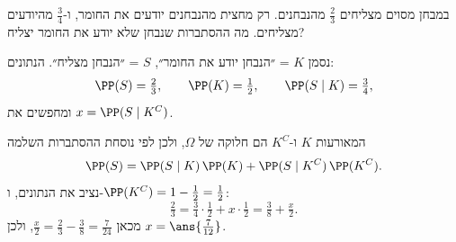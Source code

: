 במבחן מסוים מצליחים $\frac23$ מהנבחנים. רק מחצית מהנבחנים יודעים את החומר, ו-$\frac34$ מהיודעים מצליחים. מה ההסתברות שנבחן שלא יודע את החומר יצליח?
\begin{solbox}
נסמן $K$ = ״הנבחן יודע את החומר״, $S$ = ״הנבחן מצליח״. הנתונים:
\[
\PP(S)=\tfrac23,\qquad \PP(K)=\tfrac12,\qquad \PP(S\mid K)=\tfrac34,
\]
ומחפשים את $x=\PP(S\mid K^C)$.

המאורעות $K$ ו-$K^C$ הם חלוקה של $\Omega$, ולכן לפי נוסחת ההסתברות השלמה
\[
\PP(S)=\PP(S\mid K)\,\PP(K)+\PP(S\mid K^C)\,\PP(K^C).
\]
נציב את הנתונים, ו-$\PP(K^C)=1-\frac12=\frac12$:
\[
\tfrac23=\tfrac34\cdot\tfrac12+x\cdot\tfrac12=\tfrac38+\tfrac x2.
\]
מכאן $\frac x2=\frac23-\frac38=\frac7{24}$, ולכן $x=\ans{\frac7{12}}$.
\end{solbox}
